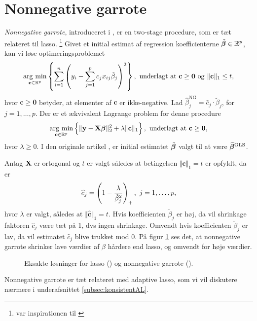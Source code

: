 \section{Nonnegative garrote}
\textit{Nonnegative garrote}, introduceret i \citep{nonnegative_garrote}, er en two-stage procedure, som er tæt relateret til lasso. \footnote{\citep{nonnegative_garrote} var inspirationen til \citep{lasso}} 
Givet et initial estimat af regression koefficienterne \(\tilde{\boldsymbol{\beta}} \in \mathbb{R}^p\), kan vi løse optimeringsproblemet
\begin{align}
\argmin_{\mathbf{c} \in \mathbb{R}^p}  \cbr{ \sum_{i=1}^n \del{y_i - \sum_{j=1}^p c_j x_{ij} \tilde{\beta}_j}^2}, \ \text{underlagt at } \mathbf{c} \geq \mathbf{0} \text{ og } \Vert \mathbf{c} \Vert_1 \leq t, \label{eq:2.19}
\end{align}
hvor \(\mathbf{c} \geq \mathbf{0}\) betyder, at elementer af \(\mathbf{c}\) er ikke-negative.
Lad \(\widehat{\beta}_j^\text{NG} = \hat{c}_j \cdot \tilde{\beta}_j\), for \(j = 1, \ldots, p\).
Der er et ækvivalent Lagrange problem for denne procedure
\begin{align}
\argmin_{\mathbf{c} \in \mathbb{R}^p}  \cbr{\Vert \y - \X \tbeta \Vert_2^2 + \lambda \Vert \mathbf{c} \Vert_1}, \ \text{underlagt at } \mathbf{c} \geq \mathbf{0}, \label{eq:nonnegative_garrote}
\end{align}
hvor \(\lambda \geq 0\).
I den originale artikel \citep{nonnegative_garrote}, er initial estimatet \(\tilde{\boldsymbol{\beta}}\) valgt til at være \(\widehat{\boldsymbol{\beta}}^\text{OLS}\).
 
Antag \(\mathbf{X}\) er ortogonal og \(t\) er valgt således at betingelsen \(\Vert \mathbf{c} \Vert_1 = t\) er opfyldt, da er
\begin{align*}
\widehat{c}_j = \del{1 - \frac{\lambda}{\tilde{\beta}_j^2}}_+, \ j = 1, \ldots, p,
\end{align*}
hvor \(\lambda\) er valgt, således at \(\Vert \widehat{\mathbf{c}} \Vert_1 = t\).
Hvis koefficienten \(\tilde{\beta}_j\) er høj, da vil shrinkage faktoren \(\hat{c}_j\) være tæt på 1, dvs ingen shrinkage.
Omvendt hvis koefficienten \(\tilde{\beta}_j\) er lav, da vil estimatet \(\hat{c}_j\) blive trukket mod 0.
På figur \ref{fig:nonnegative_garrote} ses det, at nonnegative garrote shrinker lave værdier af \(\beta\) hårdere end lasso, og omvendt for høje værdier.
%
\begin{figure}[H]
\centering
\scalebox{0.8}{}
\caption[optional short text]{Eksakte løsninger for lasso () og nonnegative garrote ().} \label{fig:nonnegative_garrote}
\end{figure}
%
Nonnegative garrote er tæt relateret med adaptive lasso, som vi vil diskutere nærmere i underafsnittet \ref{subsec:konsistentAL}.

